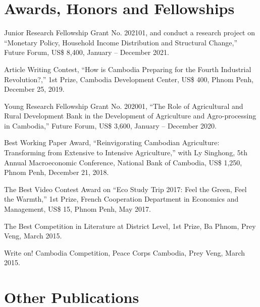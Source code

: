 \documentclass[10pt,a4paper]{article}
\begin{document}
	\section*{Awards, Honors and Fellowships} 
		\vspace{-1.5em}
		\begin{adjustwidth}{.7cm}{}
			
			\item Junior Research Fellowship Grant No. 202101, and conduct a research project on “Monetary Policy, Household Income Distribution and Structural Change,'' Future Forum, US\$ 8,400, January – December 2021.
						
			\item Article Writing Contest, “How is Cambodia Preparing for the Fourth Industrial Revolution?,'' 1st Prize, Cambodia Development Center, US\$ 400, Phnom Penh, December 25, 2019.
			
			\item Young Research Fellowship Grant No. 202001, “The Role of Agricultural and Rural Development Bank in the Development of Agriculture and Agro-processing in Cambodia,'' Future Forum, US\$ 3,600, January – December 2020.
			
			\item Best Working Paper Award, “Reinvigorating Cambodian Agriculture: Transforming from Extensive to Intensive Agriculture,'' with Ly Singhong, 5th Annual Macroeconomic Conference, National Bank of Cambodia, US\$ 1,250, Phnom Penh, December 21, 2018.
			
			\item The Best Video Contest Award on “Eco Study Trip 2017: Feel the Green, Feel the Warmth,” 1st Prize, French Cooperation Department in Economics and Management, US\$ 15, Phnom Penh, May 2017. 
			
			\item The Best Competition in Literature at District Level, 1st Prize, Ba Phnom, Prey Veng, March 2015.
			
			\item Write on! Cambodia Competition, Peace Corps Cambodia, Prey Veng, March 2015.
			
		\end{adjustwidth}
		\vspace{-1em}
	\section*{Other Publications}
		\vspace{-0.5em}
		 
\end{document}
